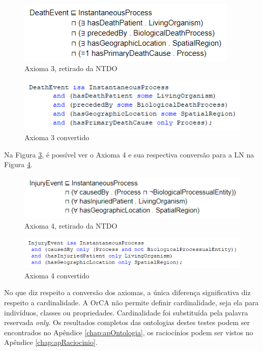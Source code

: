 \documentclass{bcc}
\begin{document}
\begin{figure}[H]
\centering
\includegraphics[width=.6\textwidth]{Figuras/axioma3.png}
\caption{Axioma 3, retirado da NTDO} 
\label{fig:axioma3}
\end{figure}

\begin{figure}[H]
\centering
\includegraphics[width=.8\textwidth]{Figuras/axioma3_ln.png}
\caption{Axioma 3 convertido} 
\label{fig:axioma3_ln}
\end{figure}

Na Figura \ref{fig:axioma4}, é possível ver o Axioma 4 e sua respectiva conversão para a LN na Figura \ref{fig:axioma4_ln}.

\begin{figure}[H]
\centering
\includegraphics[width=.8\textwidth]{Figuras/axioma4.png}
\caption{Axioma 4, retirado da NTDO} 
\label{fig:axioma4}
\end{figure}

\begin{figure}[H]
\centering
\includegraphics[width=.9\textwidth]{Figuras/axioma4_ln.png}
\caption{Axioma 4 convertido} 
\label{fig:axioma4_ln}
\end{figure}

No que diz respeito a conversão dos axiomas, a única diferença significativa diz respeito a cardinalidade. A OrCA não permite definir cardinalidade, seja ela para indivíduos, classes ou propriedades. Cardinalidade foi substituída pela palavra reservada \textit{only}.
Os resultados completos das ontologias destes testes podem ser encontrados no Apêndice \ref{chap:apOntologia}, os raciocínios podem ser vistos no Apêndice \ref{chap:apRaciocinio}.
\end{document}

